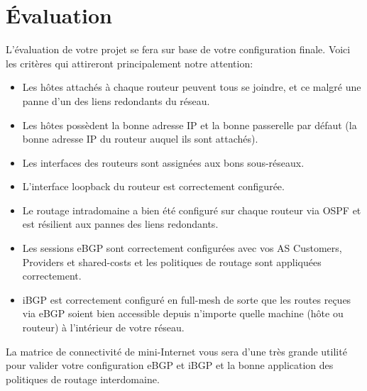 \documentclass[a4paper, 11pt]{article}
\begin{document}
\section{Évaluation}

L'évaluation de votre projet se fera sur base de votre configuration finale.
Voici les critères qui attireront principalement notre attention:

\begin{itemize}
    \item Les hôtes attachés à chaque routeur peuvent tous se joindre,
          et ce malgré une panne d'un des liens redondants du réseau.
    \item Les hôtes possèdent la bonne adresse IP et la bonne passerelle par
          défaut (la bonne adresse IP du routeur auquel ils sont attachés).
    \item Les interfaces des routeurs sont assignées aux bons sous-réseaux.
    \item L'interface loopback du routeur est correctement configurée.
    \item Le routage intradomaine a bien été configuré sur chaque routeur
          via OSPF et est résilient aux pannes des liens redondants.
    \item Les sessions eBGP sont correctement configurées avec vos AS Customers,
          Providers et shared-costs et les politiques de routage sont 
          appliquées correctement.
    \item iBGP est correctement configuré en full-mesh de sorte que les routes
          reçues via eBGP soient bien accessible depuis n'importe quelle machine
          (hôte ou routeur) à l'intérieur de votre réseau. 
\end{itemize}

La matrice de connectivité de mini-Internet vous sera d'une très grande utilité
pour valider votre configuration eBGP et iBGP et la bonne application des
politiques de routage interdomaine.



\end{document}
